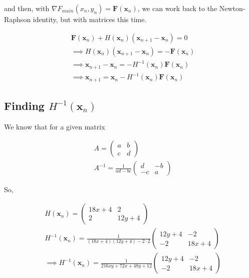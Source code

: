 \documentclass[../main.tex]{subfiles}
\begin{document}
    and then, with $\nabla F_{main}(x_{n}, y_{n}) = \mathbf{F}(\mathbf{x}_{n})$, we can work back to the
    Newton-Raphson identity, but with matrices this time.
    \begin{center*}
        \begin{align*}
            & \mathbf{F}(\mathbf{x}_{n}) +
            H(\mathbf{x}_{n})(\mathbf{x}_{n + 1} - \mathbf{x}_{n}) = 0 \\
            & \implies H(\mathbf{x}_{n})(\mathbf{x}_{n + 1} - \mathbf{x}_{n}) = -\mathbf{F}(\mathbf{x}_{n}) \\
            & \implies \mathbf{x}_{n + 1} - \mathbf{x}_{n} = -H^{-1}(\mathbf{x}_{n})\mathbf{F}(\mathbf{x}_{n}) \\
            & \implies \mathbf{x}_{n + 1} = \mathbf{x}_{n} - H^{-1}(\mathbf{x}_{n})\mathbf{F}(\mathbf{x}_{n})
        \end{align*}
    \end{center*}
    
    \subsection*{Finding $H^{-1}(\mathbf{x}_{n})$}\label{subsec:2d-nr-finding-h^-1}
    We know that for a given matrix
    \begin{center*}
        \begin{align*}
            & A = \begin{pmatrix}
                a & b \\
                c & d
            \end{pmatrix} \\
            & A^{-1} = \frac{1}{ad-bc}\begin{pmatrix}
                d & -b \\
                -c & a
            \end{pmatrix}
        \end{align*}
    \end{center*}
    So,
    \begin{center*}
        \begin{align*}
            & H(\mathbf{x}_{n}) =
            \begin{pmatrix}
                18x + 4 & 2 \\
                2 & 12y + 4
            \end{pmatrix} \\
            & H^{-1}(\mathbf{x}_{n}) =
            \frac{1}{(18x + 4)(12y + 4) - 2 \cdot 2}\begin{pmatrix}
                12y + 4 & -2 \\
                -2 & 18x + 4
            \end{pmatrix} \\
            & \implies H^{-1}(\mathbf{x}_{n}) = \frac{1}{216xy + 72x + 48y + 12}\begin{pmatrix}
                12y + 4 & -2 \\
                -2 & 18x + 4
            \end{pmatrix}
        \end{align*}
    \end{center*}
    
\end{document}
